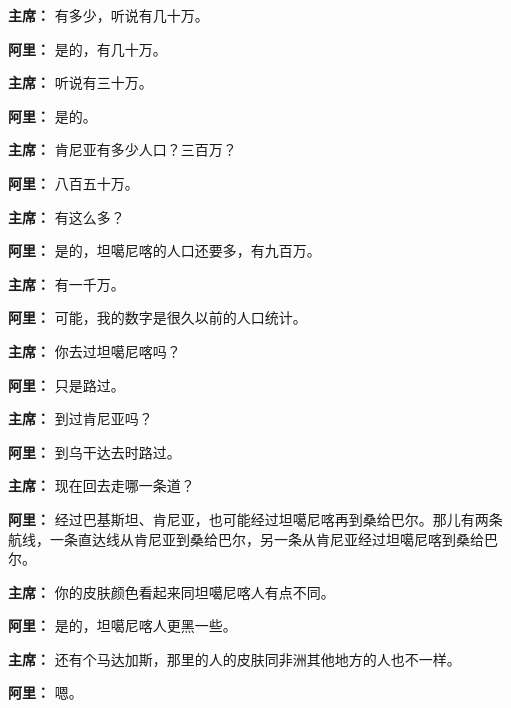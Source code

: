 \begin{list}{}
\item[\textbf{主席：}] 有多少，听说有几十万。

\item[\textbf{阿里：}] 是的，有几十万。

\item[\textbf{主席：}] 听说有三十万。

\item[\textbf{阿里：}] 是的。

\item[\textbf{主席：}] 肯尼亚有多少人口？三百万？

\item[\textbf{阿里：}] 八百五十万。

\item[\textbf{主席：}] 有这么多？

\item[\textbf{阿里：}] 是的，坦噶尼喀的人口还要多，有九百万。

\item[\textbf{主席：}] 有一千万。

\item[\textbf{阿里：}] 可能，我的数字是很久以前的人口统计。

\item[\textbf{主席：}] 你去过坦噶尼喀吗？

\item[\textbf{阿里：}] 只是路过。

\item[\textbf{主席：}] 到过肯尼亚吗？

\item[\textbf{阿里：}] 到乌干达去时路过。

\item[\textbf{主席：}] 现在回去走哪一条道？

\item[\textbf{阿里：}] 经过巴基斯坦、肯尼亚，也可能经过坦噶尼喀再到桑给巴尔。那儿有两条航线，一条直达线从肯尼亚到桑给巴尔，另一条从肯尼亚经过坦噶尼喀到桑给巴尔。

\item[\textbf{主席：}] 你的皮肤颜色看起来同坦噶尼喀人有点不同。

\item[\textbf{阿里：}] 是的，坦噶尼喀人更黑一些。

\item[\textbf{主席：}] 还有个马达加斯，那里的人的皮肤同非洲其他地方的人也不一样。

\item[\textbf{阿里：}] 嗯。


\end{list}
